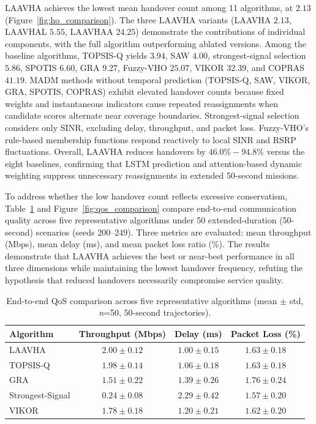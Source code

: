 \documentclass[final,3p,times,twocolumn]{elsarticle}
\begin{document}
LAAVHA achieves the lowest mean handover count among 11 algorithms, at $2.13$ (Figure~\ref{fig:ho_comparison}). The three LAAVHA variants (LAAVHA $2.13$, LAAVHAL $5.55$, LAAVHAA $24.25$) demonstrate the contributions of individual components, with the full algorithm outperforming ablated versions. Among the baseline algorithms, TOPSIS-Q yields $3.94$, SAW $4.00$, strongest-signal selection $5.86$, SPOTIS $6.60$, GRA $9.27$, Fuzzy-VHO $25.07$, VIKOR $32.39$, and COPRAS $41.19$. MADM methods without temporal prediction (TOPSIS-Q, SAW, VIKOR, GRA, SPOTIS, COPRAS) exhibit elevated handover counts because fixed weights and instantaneous indicators cause repeated reassignments when candidate scores alternate near coverage boundaries. Strongest-signal selection considers only SINR, excluding delay, throughput, and packet loss. Fuzzy-VHO's rule-based membership functions respond reactively to local SINR and RSRP fluctuations. Overall, LAAVHA reduces handovers by $46.0\%-94.8\%$ versus the eight baselines, confirming that LSTM prediction and attention-based dynamic weighting suppress unnecessary reassignments in extended 50-second missions.

To address whether the low handover count reflects excessive conservatism, Table~\ref{tab:qos_comparison} and Figure~\ref{fig:qos_comparison} compare end-to-end communication quality across five representative algorithms under 50 extended-duration (50-second) scenarios (seeds 200--249). Three metrics are evaluated: mean throughput (Mbps), mean delay (ms), and mean packet loss ratio (\%). The results demonstrate that LAAVHA achieves the best or near-best performance in all three dimensions while maintaining the lowest handover frequency, refuting the hypothesis that reduced handovers necessarily compromise service quality.

\begin{table}[H]
\centering
\caption{End-to-end QoS comparison across five representative algorithms (mean $\pm$ std, \textit{n}=50, 50-second trajectories).}
\label{tab:qos_comparison}
\begin{tabular}{lccc}
\toprule
\textbf{Algorithm} & \textbf{Throughput (Mbps)} & \textbf{Delay (ms)} & \textbf{Packet Loss (\%)} \\
\midrule
LAAVHA          & $2.00 \pm 0.12$ & $1.00 \pm 0.15$ & $1.63 \pm 0.18$ \\
TOPSIS-Q        & $1.98 \pm 0.14$ & $1.06 \pm 0.18$ & $1.63 \pm 0.18$ \\
GRA             & $1.51 \pm 0.22$ & $1.39 \pm 0.26$ & $1.76 \pm 0.24$ \\
Strongest-Signal & $0.24 \pm 0.08$ & $2.29 \pm 0.42$ & $1.57 \pm 0.20$ \\
VIKOR           & $1.78 \pm 0.18$ & $1.20 \pm 0.21$ & $1.62 \pm 0.20$ \\
\bottomrule
\end{tabular}
\end{table}
\end{document}

